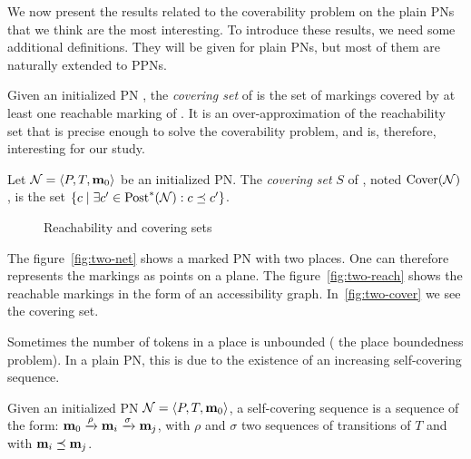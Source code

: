 We now present the results related to the coverability problem on the plain \acp{PN} that we think are the most interesting.
To introduce these results, we need some additional definitions.
They will be given for plain \acp{PN}, but most of them are naturally extended to \acp{PPN}.

Given an initialized \ac{PN} \N, the \emph{covering set} of \N is the set of markings covered by at least one reachable marking of \N.
It is an over-approximation of the reachability set that is precise enough to solve the coverability problem, and is, therefore, interesting for our study.

\begin{defi}
  Let $\mathcal{N} = \langle P,T, \mathbf{m}_0\rangle$ be an initialized \ac{PN}.
  The \emph{covering set} $S$ of \N, noted $\operatorname{Cover}(\mathcal{N})$, is the set $\{c \mid \exists c' \in \operatorname{Post}^*(\mathcal{N}) : c \preceq c' \}$.
\end{defi}

\begin{figure}[htbp]
  \label{fig:reach-and-cover-example}
  \centering
  \subfloat[A \ac{PN} ($|P| = 2$)]{
    \label{fig:two-net}
    

  }

  \qquad
  \caption{Reachability and covering sets}
\end{figure}

The figure~\ref{fig:two-net} shows a marked \ac{PN} with two places.
One can therefore represents the markings as points on a plane.
The figure~\ref{fig:two-reach} shows the reachable markings in the form of an accessibility graph.
In~\ref{fig:two-cover} we see the covering set.

Sometimes the number of tokens in a place is unbounded ( the place boundedness problem).
In a plain \ac{PN}, this is due to the existence of an increasing self-covering sequence.
\begin{defi}
  Given an initialized \ac{PN} $\mathcal{N} = \langle P,T, \mathbf{m}_0\rangle$,
  a self-covering sequence is a sequence of the form:
  \(
    \mathbf{m}_0 \xrightarrow{\rho} \mathbf{m}_i \xrightarrow{\sigma} \mathbf{m}_j
  \),
  with $\rho$ and $\sigma$ two sequences of transitions of $T$
  and with $\mathbf{m}_i \preceq \mathbf{m}_j$.
\end{defi}

